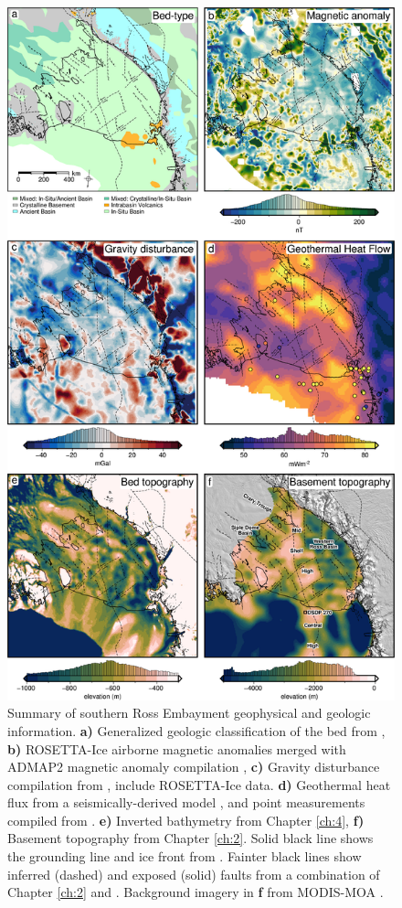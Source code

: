 \begin{figure}[p]
    \centering
    \includegraphics[width=.75\textwidth]{figures/chp5/synthesis_figure.png}
    \caption[Ross Embayment geophysical and geologic information]{Summary of southern Ross Embayment geophysical and geologic information. \textbf{a)} Generalized geologic classification of the bed from \citet{aitkenantarctic2023}, 
    \textbf{b)} ROSETTA-Ice airborne magnetic anomalies \citep{tintoross2019} merged with ADMAP2 magnetic anomaly compilation \citep{golynskynew2018}, 
    \textbf{c)} Gravity disturbance compilation from \citet{forsbergpreliminary2020}, include ROSETTA-Ice data. 
    \textbf{d)} Geothermal heat flux from a seismically-derived model \citep{shengeothermal2020}, and point measurements compiled from \citet{burton-johnsongeothermal2020}.
    \textbf{e)} Inverted bathymetry from Chapter \ref{ch:4}, 
    \textbf{f)} Basement topography from Chapter \ref{ch:2}. 
    Solid black line shows the grounding line and ice front from \citet{mouginotmeasures2017}. Fainter black lines show inferred (dashed) and exposed (solid) faults from a combination of Chapter \ref{ch:2} and \citet{coxcontinentwide2023}. Background imagery in \textbf{f} from MODIS-MOA \citep{scambosmodisbased2007}.}
    \label{fig:chp5_syntheis_figure}
\end{figure}


